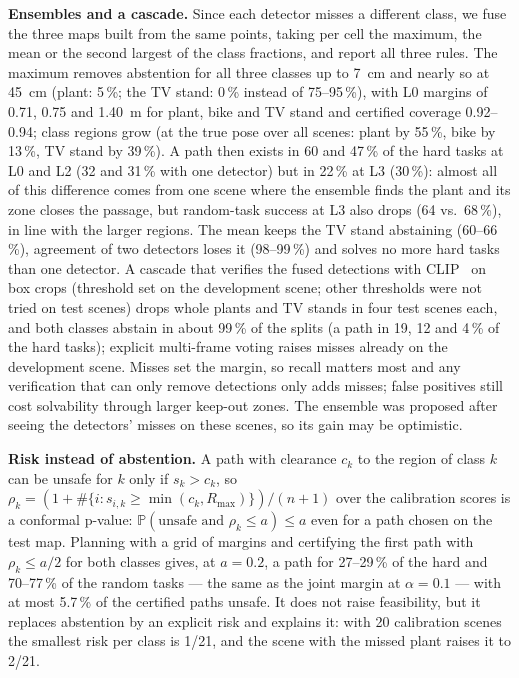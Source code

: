 \documentclass[conference]{IEEEtran}
\theoremstyle{definition}
\begin{document}
\textbf{Ensembles and a cascade.} Since each detector misses a different class, we fuse the three maps built from the
same points, taking per cell the maximum, the mean or the second largest of the class fractions, and report all three
rules. The maximum removes abstention for all three classes up to 7~cm and nearly so at 45~cm (plant: 5\,\%; the TV stand: 0\,\% instead of 75--95\,\%), with
L0 margins of 0.71, 0.75 and 1.40~m for plant, bike and TV stand and certified coverage 0.92--0.94; class regions grow (at the true pose over all scenes: plant by 55\,\%, bike by 13\,\%, TV stand by 39\,\%). A path then exists in 60 and 47\,\% of the hard tasks at L0 and L2 (32 and 31\,\% with one detector) but in
22\,\% at L3 (30\,\%): almost all of this difference comes from one scene where the ensemble finds the plant and its
zone closes the passage, but random-task success at L3 also drops (64 vs.\ 68\,\%), in line with the larger regions. The mean keeps the TV stand abstaining (60--66\,\%), agreement of two detectors loses it (98--99\,\%) and solves no
more hard tasks than one detector.
A cascade that verifies the fused detections with CLIP~\cite{clip} on box crops (threshold set on the development
scene; other thresholds were not tried on test scenes) drops whole plants and TV stands in four test scenes each, and both
classes abstain in about 99\,\% of the splits (a path in 19, 12 and 4\,\% of the hard tasks); explicit multi-frame voting raises misses already on the development scene. Misses set the margin, so recall
matters most and any verification that can only remove detections only adds misses; false positives still cost
solvability through larger keep-out zones. The ensemble was proposed
after seeing the detectors' misses on these scenes, so its gain may be optimistic.

\textbf{Risk instead of abstention.} A path with clearance $c_k$ to the region of class $k$ can be unsafe for $k$ only if
$s_k > c_k$, so $\rho_k = (1 + \#\{i: s_{i,k} \ge \min(c_k, R_{\max})\})/(n + 1)$ over the calibration scores is a conformal
p-value: $\mathbb P(\text{unsafe and } \rho_k \le a) \le a$ even for a path chosen on the test map. Planning with a grid
of margins and certifying the first path with $\rho_k \le a/2$ for both classes gives, at $a = 0.2$, a path for
27--29\,\% of the hard and 70--77\,\% of the random tasks --- the same as the joint margin at $\alpha = 0.1$ --- with at
most 5.7\,\% of the certified paths unsafe. It does not raise feasibility, but it replaces abstention by an explicit
risk and explains it: with 20 calibration scenes the smallest risk per class is 1/21, and the scene with the missed
plant raises it to 2/21.
\end{document}
